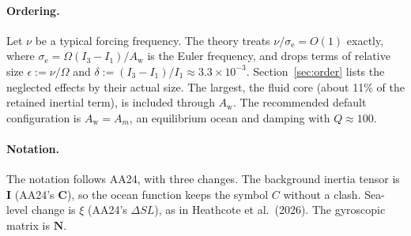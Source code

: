 \documentclass[11pt,a4paper]{article}
\newcommand{\bI}{\mathbf{I}}
\newcommand{\bN}{\mathbf{N}}
\newcommand{\se}{\sigma_{\mathrm e}}
\newcommand{\Aw}{A_{\mathrm w}}
\begin{document}
\paragraph{Ordering.} Let $\nu$ be a typical forcing frequency. The theory treats
$\nu/\se=O(1)$ exactly, where $\se=\Omega(I_3-I_1)/\Aw$ is the Euler frequency, and drops terms
of relative size $\epsilon:=\nu/\Omega$ and $\delta:=(I_3-I_1)/I_1\approx3.3\times10^{-3}$.
Section~\ref{sec:order} lists the neglected effects by their actual size. The largest, the fluid
core (about 11\% of the retained inertial term), is included through $\Aw$. The recommended default
configuration is $\Aw=A_m$, an equilibrium ocean and damping with $Q\approx100$.

\paragraph{Notation.} The notation follows AA24, with three changes. The background inertia tensor
is $\bI$ (AA24's $\mathbf{C}$), so the ocean function keeps the symbol $C$ without a clash.
Sea-level change is $\xi$ (AA24's $\Delta SL$), as in Heathcote et al.\ (2026). The gyroscopic matrix is
$\bN$.
\end{document}

